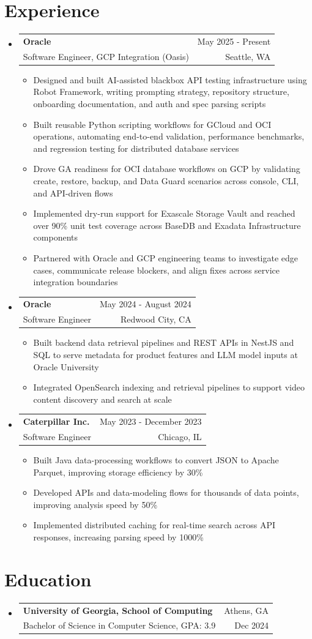 \documentclass[letterpaper,11pt]{article}
\makeatletter
\newcommand{\resumeItem}[1]{
  \item\small{
    {#1 \vspace{-1pt}}
  }
}
\newcommand{\resumeSubheading}[4]{
  \vspace{-2pt}\item
    \begin{tabular*}{0.97\textwidth}[t]{l@{\extracolsep{\fill}}r}
      \textbf{#1} & #2 \\
      {\small#3} & {\small #4} \\
    \end{tabular*}\vspace{-7pt}
}
\newcommand{\resumeSubHeadingListStart}{\begin{itemize}[leftmargin=0.15in, label={}]}
\newcommand{\resumeSubHeadingListEnd}{\end{itemize}}
\newcommand{\resumeItemListStart}{\begin{itemize}[leftmargin=0.18in,itemsep=1pt,topsep=2pt]}
\newcommand{\resumeItemListEnd}{\end{itemize}\vspace{-5pt}}
\makeatother
\begin{document}
\section{Experience}
  \resumeSubHeadingListStart

    \resumeSubheading
  {Oracle}{May 2025 - Present}
  {Software Engineer, GCP Integration (Oasis)}{Seattle, WA}
  \resumeItemListStart
    \resumeItem{Designed and built AI-assisted blackbox API testing infrastructure using Robot Framework, writing prompting strategy, repository structure, onboarding documentation, and auth and spec parsing scripts}
    \resumeItem{Built reusable Python scripting workflows for GCloud and OCI operations, automating end-to-end validation, performance benchmarks, and regression testing for distributed database services}
    \resumeItem{Drove GA readiness for OCI database workflows on GCP by validating create, restore, backup, and Data Guard scenarios across console, CLI, and API-driven flows}
    \resumeItem{Implemented dry-run support for Exascale Storage Vault and reached over 90\% unit test coverage across BaseDB and Exadata Infrastructure components}
    \resumeItem{Partnered with Oracle and GCP engineering teams to investigate edge cases, communicate release blockers, and align fixes across service integration boundaries}
  \resumeItemListEnd

    \resumeSubheading
      {Oracle}{May 2024 - August 2024}
      {Software Engineer}{Redwood City, CA}
      \resumeItemListStart
        \resumeItem{Built backend data retrieval pipelines and REST APIs in NestJS and SQL to serve metadata for product features and LLM model inputs at Oracle University}
        \resumeItem{Integrated OpenSearch indexing and retrieval pipelines to support video content discovery and search at scale}
      \resumeItemListEnd

    \resumeSubheading
      {Caterpillar Inc.}{May 2023 - December 2023}
      {Software Engineer}{Chicago, IL}
      \resumeItemListStart
        \resumeItem{Built Java data-processing workflows to convert JSON to Apache Parquet, improving storage efficiency by 30\%}
        \resumeItem{Developed APIs and data-modeling flows for thousands of data points, improving analysis speed by 50\%}
        \resumeItem{Implemented distributed caching for real-time search across API responses, increasing parsing speed by 1000\%}
      \resumeItemListEnd

  \resumeSubHeadingListEnd

\section{Education}
  \resumeSubHeadingListStart
    \resumeSubheading
      {University of Georgia, School of Computing}{Athens, GA}
      {Bachelor of Science in Computer Science, GPA: 3.9}{Dec 2024}
  \resumeSubHeadingListEnd
\end{document}
